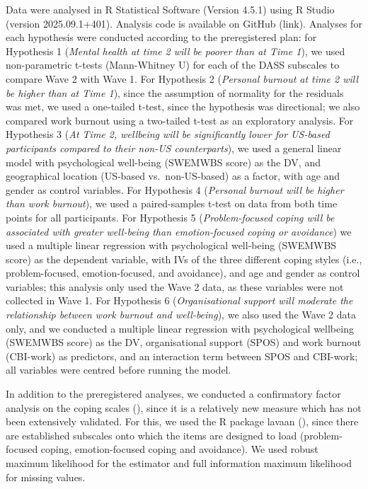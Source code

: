 \documentclass[
  man,
  longtable,
  nolmodern,
  notxfonts,
  notimes,
  colorlinks=true,linkcolor=blue,citecolor=blue,urlcolor=blue]{apa7}
\begin{document}
Data were analysed in R Statistical Software (Version 4.5.1) using R
Studio (version 2025.09.1+401). Analysis code is available on GitHub
(link). Analyses for each hypothesis were conducted according to the
preregistered plan: for Hypothesis 1 (\emph{Mental health at time 2 will
be poorer than at Time 1}), we used non-parametric t-tests (Mann-Whitney
U) for each of the DASS subscales to compare Wave 2 with Wave 1. For
Hypothesis 2 (\emph{Personal burnout at time 2 will be higher than at
Time 1}), since the assumption of normality for the residuals was met,
we used a one-tailed t-test, since the hypothesis was directional; we
also compared work burnout using a two-tailed t-test as an exploratory
analysis. For Hypothesis 3 (\emph{At Time 2, wellbeing will be
significantly lower for US-based participants compared to their non-US
counterparts}), we used a general linear model with psychological
well-being (SWEMWBS score) as the DV, and geographical location
(US-based vs.~non-US-based) as a factor, with age and gender as control
variables. For Hypothesis 4 (\emph{Personal burnout will be higher than
work burnout}), we used a paired-samples t-test on data from both time
points for all participants. For Hypothesis 5 (\emph{Problem-focused
coping will be associated with greater well-being than emotion-focused
coping or avoidance}) we used a multiple linear regression with
psychological well-being (SWEMWBS score) as the dependent variable, with
IVs of the three different coping styles (i.e., problem-focused,
emotion-focused, and avoidance), and age and gender as control
variables; this analysis only used the Wave 2 data, as these variables
were not collected in Wave 1. For Hypothesis 6 (\emph{Organisational
support will moderate the relationship between work burnout and
well-being}), we also used the Wave 2 data only, and we conducted a
multiple linear regression with psychological wellbeing (SWEMWBS score)
as the DV, organisational support (SPOS) and work burnout (CBI-work) as
predictors, and an interaction term between SPOS and CBI-work; all
variables were centred before running the model.

In addition to the preregistered analyses, we conducted a confirmatory
factor analysis on the coping scales
(), since it is a relatively new measure which has not been
extensively validated. For this, we used the R package lavaan
(), since there
are established subscales onto which the items are designed to load
(problem-focused coping, emotion-focused coping and avoidance). We used
robust maximum likelihood for the estimator and full information maximum
likelihood for missing values.
\end{document}
